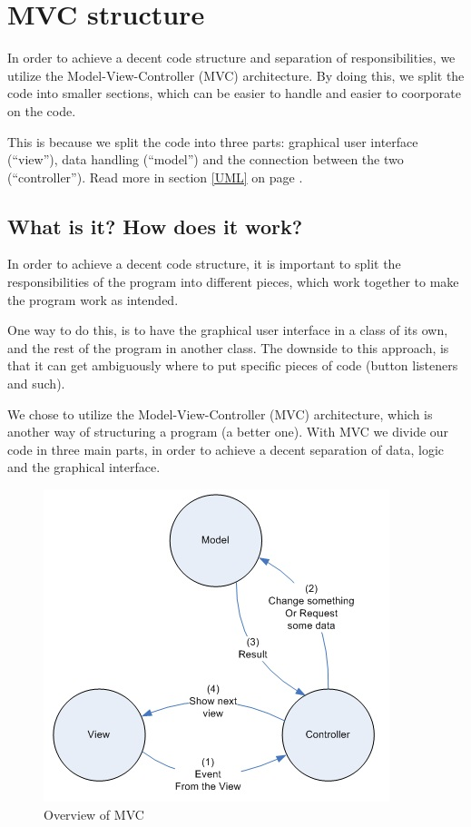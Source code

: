 \section{MVC structure}
\label{BG-MVC}
In order to achieve a decent code structure and separation of responsibilities, 
we utilize the Model-View-Controller (MVC) architecture. By doing this, we split 
the code into smaller sections, which can be easier to handle and easier to 
coorporate on the code.

This is because we split the code into three parts: graphical user interface 
(``view''), data handling (``model'') and the connection between the two 
(``controller''). Read more in section \ref{UML}  on 
page \pageref{UML}.

\subsection{What is it? How does it work?}
In order to achieve a decent code structure, it is important to split the 
responsibilities of the program into different pieces, which work together 
to make the program work as intended.

One way to do this, is to have the graphical user interface in a class of its
own, and the rest of the program in another class. The downside to this
approach, is that it can get ambiguously where to put specific pieces of code
(button listeners and such).

We chose to utilize the Model-View-Controller (MVC) architecture, which is
another way of structuring a program (a better one). With MVC we divide our code
in three main parts, in order to achieve a decent separation of data, logic and
the graphical interface.

\begin{figure}[h!]
\centering
\includegraphics[width=0.5\linewidth]{images/mvc}
\caption{Overview of MVC}
\label{mvc-overview}
\end{figure}

